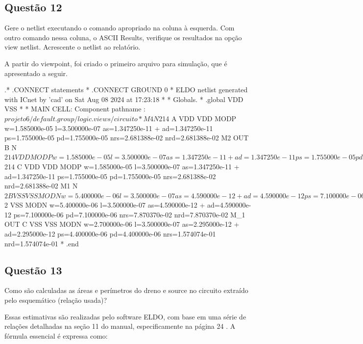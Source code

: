 \documentclass[12pt,a4paper]{article}
\begin{document}
\subsection*{Questão 12}

Gere o netlist executando o comando apropriado na coluna à esquerda. Com outro comando nessa coluna, o ASCII Results, verifique os resultados na opção view netlist. Acrescente o netlist ao relatório.

A partir do viewpoint, foi criado o primeiro arquivo para simulação, que é apresentado a seguir.


\begin{codeblock}[title={Exemplo de Netlist}, label={lst:netlist}, listing options={language=TeX}]
.* .CONNECT statements
*
.CONNECT GROUND 0
* ELDO netlist generated with ICnet by 'cad' on Sat Aug 08 2024 at 17:23:18
*
* Globals.
*
.global VDD VSS
*
* MAIN CELL: Component pathname :
$projeto6/default.group/logic.views/circuito
*
M4 N$214 A VDD VDD MODP w=1.585000e-05 l=3.500000e-07
as=1.347250e-11
+ ad=1.347250e-11 ps=1.755000e-05 pd=1.755000e-05 nrs=2.681388e-02
nrd=2.681388e-02
M2 OUT B N$214 VDD MODP w=1.585000e-05 l=3.500000e-07
as=1.347250e-11
+ ad=1.347250e-11 ps=1.755000e-05 pd=1.755000e-05 nrs=2.681388e-02
nrd=2.681388e-02
M3 N$214 C VDD VDD MODP w=1.585000e-05 l=3.500000e-07
as=1.347250e-11
+ ad=1.347250e-11 ps=1.755000e-05 pd=1.755000e-05 nrs=2.681388e-02
nrd=2.681388e-02
M1 N$2 B VSS VSS MODN w=5.400000e-06 l=3.500000e-07 as=4.590000e-12
+ ad=4.590000e-12 ps=7.100000e-06 pd=7.100000e-06 nrs=7.870370e-02
nrd=7.870370e-02
M_2 OUT A N$2 VSS MODN w=5.400000e-06 l=3.500000e-07
as=4.590000e-12
+ ad=4.590000e-12 ps=7.100000e-06 pd=7.100000e-06 nrs=7.870370e-02
nrd=7.870370e-02
M_1 OUT C VSS VSS MODN w=2.700000e-06 l=3.500000e-07
as=2.295000e-12
+ ad=2.295000e-12 ps=4.400000e-06 pd=4.400000e-06 nrs=1.574074e-01
nrd=1.574074e-01
*
.end
\end{codeblock}

\subsection*{Questão 13}

Como são calculadas as áreas e perímetros do dreno e source no circuito extraído pelo esquemático (relação usada)?

Essas estimativas são realizadas pelo software ELDO, com base em uma série de relações detalhadas na seção 11 do manual, especificamente na página 24 \cite{ref1}. A fórmula essencial é expressa como:
\end{document}
